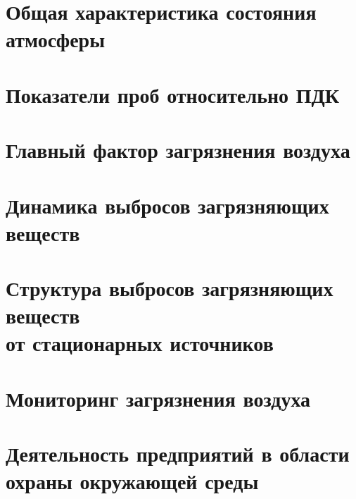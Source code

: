

\section{Общая характеристика состояния атмосферы}
\begin{frame}{\insertsectionhead}
\end{frame}

\section{Показатели проб относительно ПДК}
\begin{frame}{\insertsectionhead}
\end{frame}

\section{Главный фактор загрязнения воздуха}
\begin{frame}{\insertsectionhead}
\end{frame}

\section{Динамика выбросов загрязняющих веществ}
\begin{frame}{\insertsectionhead}
\end{frame}

\section{Структура выбросов загрязняющих веществ \\ от
стационарных источников}
\begin{frame}{\insertsectionhead}
\end{frame}

\section{Мониторинг загрязнения воздуха}
\begin{frame}{\insertsectionhead}
\end{frame}

\section{Деятельность предприятий в области \\ охраны окружающей среды}
\begin{frame}{\insertsectionhead}
\end{frame}

